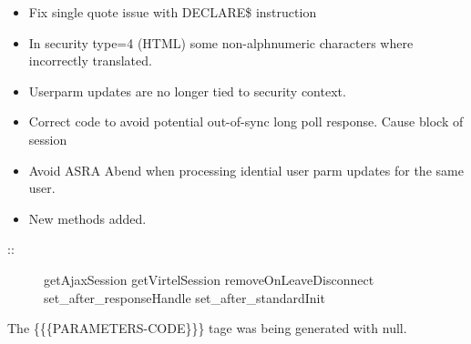 \documentclass[letterpaper,10pt,english]{sphinxmanual}
\begin{document}
\begin{itemize}
\item {} 
Fix single quote issue with DECLARE\$ instruction

\end{itemize}

\begin{itemize}
\item {} 
In security type=4 (HTML) some non-alphnumeric characters where incorrectly translated.

\end{itemize}

\begin{itemize}
\item {} 
Userparm updates are no longer tied to security context.

\end{itemize}

\begin{itemize}
\item {} 
Correct code to avoid potential out-of-sync long poll response. Cause block of session

\end{itemize}

\begin{itemize}
\item {} 
Avoid ASRA Abend when processing idential user parm updates for the same user.

\end{itemize}

\begin{itemize}
\item {} 
New methods added.

\end{itemize}
\begin{description}
\item[{::}] \leavevmode
getAjaxSession
getVirtelSession
removeOnLeaveDisconnect
set\_after\_responseHandle
set\_after\_standardInit

\end{description}


The \{\{\{PARAMETERS-CODE\}\}\} tage was being generated with null.
\end{document}

